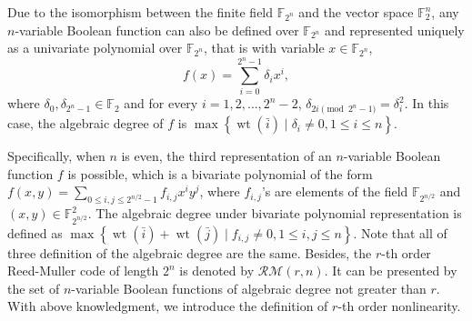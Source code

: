 \documentclass{article}
\newcommand{\F}{\mathbb{F}}
\newcommand{\0}{\textbf{0}}
\newcommand{\1}{\textbf{1}}
\newcommand{\wt}{\operatorname{wt}}
\theoremstyle{plain}
\begin{document}

    Due to the isomorphism between the finite field $ \F_{2^n} $ and the vector space $ \F_2^n $, 
    any $ n $-variable Boolean function can also be defined over $ \F_{2^n} $ and represented uniquely as a univariate polynomial over $ \F_{2^n} $, that is with variable $ x\in\F_{2^n} $,  
    \[f(x) = \sum_{i=0}^{2^n-1}\delta_ix^i,\] 
    where $ \delta_0,\delta_{2^n-1}\in\F_2 $ and for every $ i=1,2,\dots,2^n-2 $, $ \delta_{2i\pmod{2^n-1}}=\delta_i^2 $. 
    In this case, the algebraic degree of $ f $ is $ \max\left\{ \wt(\bar{i})\mid \delta_i\ne 0, 1\le i\le n \right\} $. 

    

    Specifically, when $ n $ is even, the third representation of an $ n $-variable Boolean function $ f $ is possible, which is a bivariate polynomial of the form $ f(x,y)=\sum_{0\le i,j\le 2^{n/2}-1}f_{i,j}x^iy^j $, where $ f_{i,j} $'s are elements of the field $ \F_{2^{n/2}} $ and $ (x,y)\in\F_{2^{n/2}}^2 $.  
    The algebraic degree under bivariate polynomial representation is defined as $ \max\left\{ \wt(\bar{i})+\wt(\bar{j})\mid f_{i,j}\ne 0, 1\le i,j\le n \right\} $. 
    Note that all of three definition of the algebraic degree are the same. 
    Besides, the $ r $-th order Reed-Muller code of length $ 2^n $ is denoted by $ \mathcal{RM}(r, n) $. 
    It can be presented by the set of $ n $-variable Boolean functions of algebraic degree not greater than $ r $. 
    With above knowledgment, we introduce the definition of $ r $-th order nonlinearity. 
\end{document}
